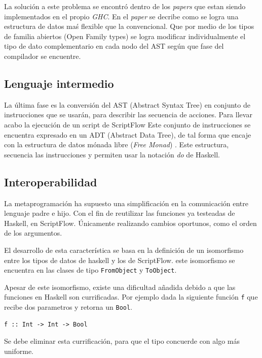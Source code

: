 \documentclass[11pt]{article}
\begin{document}
La solución a este problema se encontró dentro de los \emph{papers} que estan siendo implementados en el propio \emph{GHC}. En el \emph{paper} \cite{shayan-2017-trees}
se decribe como se logra una estructura de datos maś flexible que la convencional. Que por medio de los tipos de familia abiertos (Open Family types)
se logra modificar individualmente el tipo de dato complementario en cada nodo del AST según que fase del compilador se encuentre.

\subsection{Lenguaje intermedio}
\label{sec:org5b938ae}

\label{org1bffe9a} La última fase es la conversión del AST (Abstract Syntax Tree) en conjunto de instrucciones
que se usarán, para describir las secuencia de acciones. Para llevar acabo la ejecución de un script de ScriptFlow
Este conjunto de instrucciones se encuentra expresado en un ADT (Abstract Data Tree), de tal forma que encaje con la estructura
de datos mónada libre (\emph{Free Monad}) \cite{free-monads}. Este estructura, secuencia las instrucciones y permiten usar la notación \emph{do} de Haskell.

\subsection{Interoperabilidad}
\label{sec:org76fc10e}

La metaprogramación ha supuesto una simplificación en la comunicación entre lenguaje padre e hijo. Con el fin de reutilizar las funciones
ya testeadas de Haskell, en ScriptFlow. Únicamente realizando cambios oportunos, como el orden de los argumentos.

El desarrollo de esta característica se basa en la definición de un isomorfismo entre los tipos de datos de haskell y los de ScriptFlow.
este isomorfismo se encuentra en las clases de tipo \texttt{FromObject} y \texttt{ToObject}.

Apesar de este isomorfismo, existe una dificultad añadida debido a que las funciones en Haskell son currificadas. Por ejemplo dada la siguiente
función \texttt{f} que recibe dos parametros y retorna un \texttt{Bool}.

\begin{verbatim}
f :: Int -> Int -> Bool
\end{verbatim}

Se debe eliminar esta currificación, para que el tipo concuerde con algo más uniforme.
\end{document}
